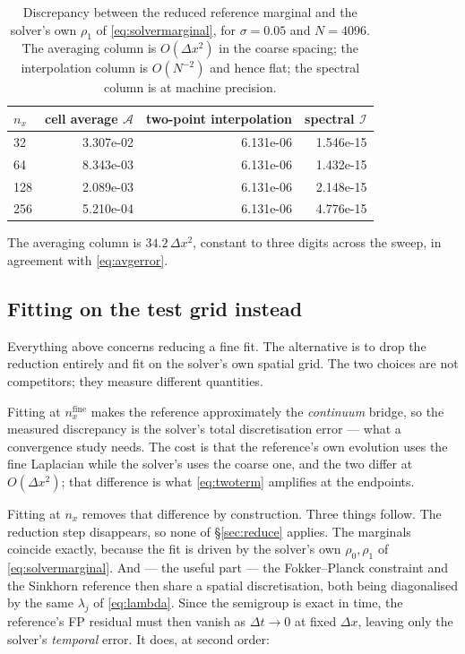 \documentclass[11pt]{article}
\newcommand{\dt}{\Delta t}
\newcommand{\dx}{\Delta x}
\begin{document}
\begin{table}[htbp]
\centering
\caption{Discrepancy between the reduced reference marginal and the solver's own
$\rho_1$ of \eqref{eq:solvermarginal}, for $\sigma=0.05$ and $N=4096$. The
averaging column is $O(\dx^2)$ in the coarse spacing; the interpolation column
is $O(N^{-2})$ and hence flat; the spectral column is at machine precision.}
\label{tab:reduce}
\begin{tabular}{@{}lrrr@{}}
\toprule
$n_x$ & cell average $\mathcal{A}$ & two-point interpolation & spectral $\mathcal{I}$ \\
\midrule
32  & 3.307e-02 & 6.131e-06 & 1.546e-15 \\
64  & 8.343e-03 & 6.131e-06 & 1.432e-15 \\
128 & 2.089e-03 & 6.131e-06 & 2.148e-15 \\
256 & 5.210e-04 & 6.131e-06 & 4.776e-15 \\
\bottomrule
\end{tabular}
\end{table}

\noindent
The averaging column is $34.2\,\dx^2$, constant to three digits across the
sweep, in agreement with \eqref{eq:avgerror}.

\subsection{Fitting on the test grid instead}
\label{sec:samenx}

Everything above concerns reducing a fine fit. The alternative is to drop the
reduction entirely and fit on the solver's own spatial grid. The two choices
are not competitors; they measure different quantities.

Fitting at $n_x^{\text{fine}}$ makes the reference approximately the
\emph{continuum} bridge, so the measured discrepancy is the solver's total
discretisation error --- what a convergence study needs. The cost is that the
reference's own evolution uses the fine Laplacian while the solver's uses the
coarse one, and the two differ at $O(\dx^2)$; that difference is what
\eqref{eq:twoterm} amplifies at the endpoints.

Fitting at $n_x$ removes that difference by construction. Three things follow.
The reduction step disappears, so none of \S\ref{sec:reduce} applies. The
marginals coincide exactly, because the fit is driven by the solver's own
$\rho_0,\rho_1$ of \eqref{eq:solvermarginal}. And --- the useful part --- the
Fokker--Planck constraint and the Sinkhorn reference then share a spatial
discretisation, both being diagonalised by the same $\lambda_j$ of
\eqref{eq:lambda}. Since the semigroup is exact in time, the reference's FP
residual must then vanish as $\dt\to0$ at fixed $\dx$, leaving only the
solver's \emph{temporal} error. It does, at second order:
\end{document}
